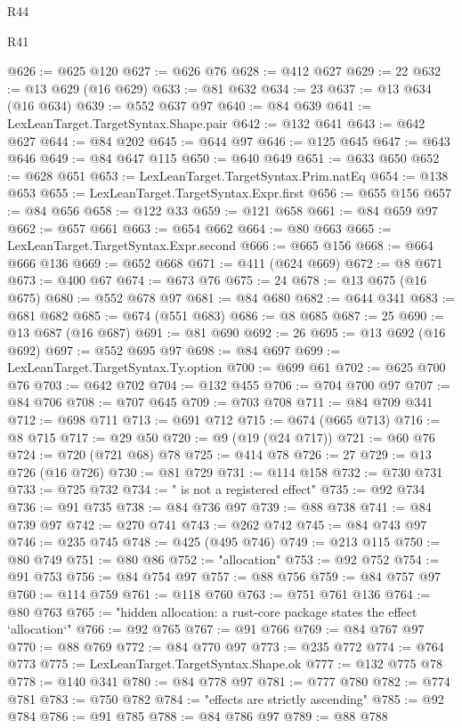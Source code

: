 \begin{lexlean}{R44}
\begin{lexlean}{R41}
\begin{coremodule}
{{{{{{{{{{{{{{{{{{{{{{{{{{{{{{{{{{{{{{{{{{{{{{{{{{{{{{{{{{{{{{{{{{{{{{{{{{{{{{{{{{{{{{{@626 := @625 @120
@627 := @626 @76
@628 := @412 @627
@629 := 22
@632 := @13 @629 (@16 @629)
@633 := @81 @632
@634 := 23
@637 := @13 @634 (@16 @634)
@639 := @552 @637 @97
@640 := @84 @639
@641 := LexLeanTarget.TargetSyntax.Shape.pair
@642 := @132 @641
@643 := @642 @627
@644 := @84 @202
@645 := @644 @97
@646 := @125 @645
@647 := @643 @646
@649 := @84 @647 @115
@650 := @640 @649
@651 := @633 @650
@652 := @628 @651
@653 := LexLeanTarget.TargetSyntax.Prim.natEq
@654 := @138 @653
@655 := LexLeanTarget.TargetSyntax.Expr.first
@656 := @655 @156
@657 := @84 @656
@658 := @122 @33
@659 := @121 @658
@661 := @84 @659 @97
@662 := @657 @661
@663 := @654 @662
@664 := @80 @663
@665 := LexLeanTarget.TargetSyntax.Expr.second
@666 := @665 @156
@668 := @664 @666 @136
@669 := @652 @668
@671 := @411 (@624 @669)
@672 := @8 @671
@673 := @400 @67
@674 := @673 @76
@675 := 24
@678 := @13 @675 (@16 @675)
@680 := @552 @678 @97
@681 := @84 @680
@682 := @644 @341
@683 := @681 @682
@685 := @674 (@551 @683)
@686 := @8 @685
@687 := 25
@690 := @13 @687 (@16 @687)
@691 := @81 @690
@692 := 26
@695 := @13 @692 (@16 @692)
@697 := @552 @695 @97
@698 := @84 @697
@699 := LexLeanTarget.TargetSyntax.Ty.option
@700 := @699 @61
@702 := @625 @700 @76
@703 := @642 @702
@704 := @132 @455
@706 := @704 @700 @97
@707 := @84 @706
@708 := @707 @645
@709 := @703 @708
@711 := @84 @709 @341
@712 := @698 @711
@713 := @691 @712
@715 := @674 (@665 @713)
@716 := @8 @715
@717 := @29 @50
@720 := @9 (@19 (@24 @717))
@721 := @60 @76
@724 := @720 (@721 @68) @78
@725 := @414 @78
@726 := 27
@729 := @13 @726 (@16 @726)
@730 := @81 @729
@731 := @114 @158
@732 := @730 @731
@733 := @725 @732
@734 := " is not a registered effect"
@735 := @92 @734
@736 := @91 @735
@738 := @84 @736 @97
@739 := @88 @738
@741 := @84 @739 @97
@742 := @270 @741
@743 := @262 @742
@745 := @84 @743 @97
@746 := @235 @745
@748 := @425 (@495 @746)
@749 := @213 @115
@750 := @80 @749
@751 := @80 @86
@752 := "allocation"
@753 := @92 @752
@754 := @91 @753
@756 := @84 @754 @97
@757 := @88 @756
@759 := @84 @757 @97
@760 := @114 @759
@761 := @118 @760
@763 := @751 @761 @136
@764 := @80 @763
@765 := "hidden allocation: a rust-core package states the effect `allocation`"
@766 := @92 @765
@767 := @91 @766
@769 := @84 @767 @97
@770 := @88 @769
@772 := @84 @770 @97
@773 := @235 @772
@774 := @764 @773
@775 := LexLeanTarget.TargetSyntax.Shape.ok
@777 := @132 @775 @78
@778 := @140 @341
@780 := @84 @778 @97
@781 := @777 @780
@782 := @774 @781
@783 := @750 @782
@784 := "effects are strictly ascending"
@785 := @92 @784
@786 := @91 @785
@788 := @84 @786 @97
@789 := @88 @788
}}}}}}}}}}}}}}}}}}}}}}}}}}}}}}}}}}}}}}}}}}}}}}}}}}}}}}}}}}}}}}}}}}}}}}}}}}}}}}}}}}}}}}}
\end{coremodule}
\end{lexlean}
\end{lexlean}
